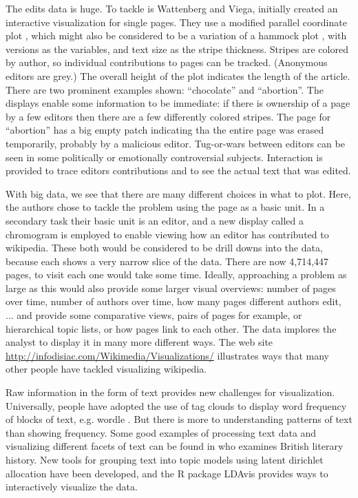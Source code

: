 \documentclass{article}
\begin{document}
The edits data is huge. To tackle is Wattenberg and Viega, initially created an interactive visualization for single pages. They use a modified parallel coordinate plot \citep{In85,We90}, which might also be considered to be a variation of a hammock plot \citep{hammock,ggparallel}, with versions as the variables, and text size as the stripe thickness. Stripes are colored by author, so individual contributions to pages can be tracked. (Anonymous editors are grey.) The overall height of the plot indicates the length of the article. There are two prominent examples shown: ``chocolate'' and ``abortion''. The displays enable some information to be immediate: if there is ownership of a page by a few editors then there are a few differently colored stripes. The page for ``abortion'' has a big empty patch indicating tha the entire page was erased temporarily, probably by a malicious editor. Tug-or-wars between editors can be seen in some politically or emotionally controversial subjects. Interaction is provided to trace editors contributions and to see the actual text that was edited.

With big data, we see that there are many different choices in what to plot. Here, the authors chose to tackle the problem using the page as a basic unit. In a secondary task their basic unit is an editor, and a new display called a chromogram {\color[rgb]{0,0,1} \citep{wattenberg2007visualizing}} is employed to enable viewing how an editor has contributed to wikipedia.  These both would be considered to be drill downs into the data, because each shows a very narrow slice of the data. There are now 4,714,447 pages, to visit each one would take some time. Ideally, approaching a problem as large as this would also provide some larger visual overviews: number of pages over time, number of authors over time, how many pages different authors edit, ... and provide some comparative views, pairs of pages for example, or hierarchical topic lists, or how pages link to each other. The data implores the analyst to display it in many more different ways. The web site \url{http://infodisiac.com/Wikimedia/Visualizations/} illustrates ways that many other people have tackled visualizing wikipedia.

Raw information in the form of text provides new challenges for visualization. Universally, people have adopted the use of tag clouds to display word frequency of blocks of text, e.g. wordle \citep{wordle}. But there is more to understanding patterns of text than showing frequency. Some good examples of processing text data and visualizing different facets of text can be found in \citet{jockers} who examines British literary history. New tools for grouping text into topic models using latent dirichlet allocation have been developed, and the R \citep{R} package LDAvis \citep{LDAvis} provides ways to interactively visualize the data.
\end{document}
